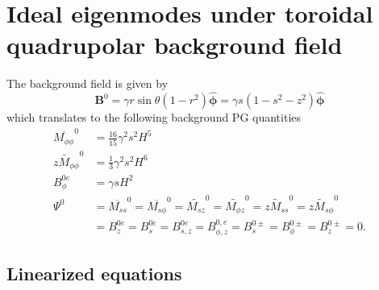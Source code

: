 \section{Ideal eigenmodes under toroidal quadrupolar background field}

The background field is given by
\[
    \mathbf{B}^0 = \gamma r\sin\theta (1 - r^2) \hat{\bm{\phi}} = \gamma s (1 - s^2 - z^2) \hat{\bm{\phi}}
\]
which translates to the following background PG quantities
\begin{equation}
\begin{aligned}
    \overline{M_{\phi\phi}}^0 &= \frac{16}{15}\gamma^2 s^2 H^5 \\
    \widetilde{zM_{\phi\phi}}^0 &= \frac{1}{3}\gamma^2 s^2 H^6 \\
    B_{\phi}^{0e} &= \gamma s H^{2} \\
    \Psi^{0} &= \overline{M_{ss}}^0 = \overline{M_{s\phi}}^0 = \widetilde{M_{sz}}^0 = \widetilde{M_{\phi z}}^0 = \widetilde{zM_{ss}}^0 = \widetilde{zM_{s\phi}}^0 \\
    &= B_{z}^{0e} = B_{s}^{0e} = B_{s,z}^{0e} = B_{\phi,z}^{0,e} = B_s^{0\pm} = B_{\phi}^{0\pm} = B_z^{0\pm} = 0.
\end{aligned}
\end{equation}

\subsection{Linearized equations}

